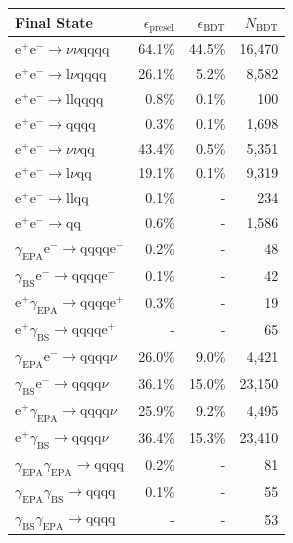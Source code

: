 \begin{table}[h!]
\centering
\begin{tabular}{ l r r r }
\hline
Final State & $\epsilon_{\text{presel}}$ & $\epsilon_{\text{BDT}}$ & $N_{\text{BDT}}$ \\ 
\hline
$\text{e}^{+}\text{e}^{-} \rightarrow \nu{\nu}\text{qqqq}$ & 64.1\% & 44.5\% & 16,470 \\
$\text{e}^{+}\text{e}^{-} \rightarrow \text{l}\nu\text{qqqq}$ & 26.1\% & 5.2\% & 8,582 \\
$\text{e}^{+}\text{e}^{-} \rightarrow \text{llqqqq}$ & 0.8\% & 0.1\% & 100 \\
$\text{e}^{+}\text{e}^{-} \rightarrow \text{qqqq}$ & 0.3\% & 0.1\% & 1,698 \\
$\text{e}^{+}\text{e}^{-} \rightarrow \nu{\nu}\text{qq}$ & 43.4\% & 0.5\% & 5,351 \\
$\text{e}^{+}\text{e}^{-} \rightarrow \text{l}\nu\text{qq}$ & 19.1\% & 0.1\% & 9,319 \\
$\text{e}^{+}\text{e}^{-} \rightarrow \text{llqq}$ & 0.1\% & - & 234 \\
$\text{e}^{+}\text{e}^{-} \rightarrow \text{qq}$ & 0.6\% & - & 1,586 \\
$\gamma_{\text{EPA}}\text{e}^{-} \rightarrow \text{qqqq}\text{e}^{-}$ & 0.2\% & - & 48 \\
$\gamma_{\text{BS}}\text{e}^{-} \rightarrow \text{qqqq}\text{e}^{-}$ & 0.1\% & - & 42 \\
$\text{e}^{+}\gamma_{\text{EPA}} \rightarrow \text{qqqq}\text{e}^{+}$ & 0.3\% & - & 19 \\
$\text{e}^{+}\gamma_{\text{BS}} \rightarrow \text{qqqq}\text{e}^{+}$ & - & - & 65 \\
$\gamma_{\text{EPA}}\text{e}^{-} \rightarrow \text{qqqq}\nu$ & 26.0\% & 9.0\% & 4,421 \\
$\gamma_{\text{BS}}\text{e}^{-} \rightarrow \text{qqqq}\nu$ & 36.1\% & 15.0\% & 23,150 \\
$\text{e}^{+}\gamma_{\text{EPA}} \rightarrow \text{qqqq}\nu$ & 25.9\% & 9.2\% & 4,495 \\
$\text{e}^{+}\gamma_{\text{BS}} \rightarrow \text{qqqq}\nu$ & 36.4\% & 15.3\% & 23,410 \\
$\gamma_{\text{EPA}}\gamma_{\text{EPA}} \rightarrow \text{qqqq}$ & 0.2\% & - & 81 \\
$\gamma_{\text{EPA}}\gamma_{\text{BS}} \rightarrow \text{qqqq}$ & 0.1\% & - & 55 \\
$\gamma_{\text{BS}}\gamma_{\text{EPA}} \rightarrow \text{qqqq}$ & - & - & 53 \\

\end{tabular}
\end{table}
